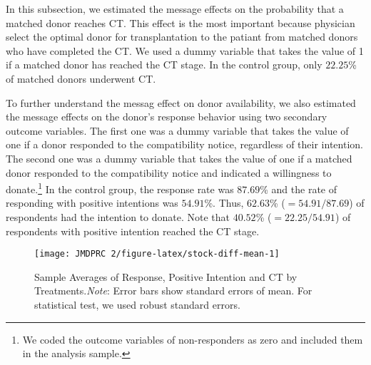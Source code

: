\documentclass[12pt, a4paper]{article}
\begin{document}
In this subsection, we estimated the message effects on the probability that a matched donor reaches CT. This effect is the most important because physician select the optimal donor for transplantation to the patiant from matched donors who have completed the CT. We used a dummy variable that takes the value of 1 if a matched donor has reached the CT stage. In the control group, only \(22.25\)\% of matched donors underwent CT.

To further understand the messag effect on donor availability, we also estimated the message effects on the donor's response behavior using two secondary outcome variables. The first one was a dummy variable that takes the value of one if a donor responded to the compatibility notice, regardless of their intention. The second one was a dummy variable that takes the value of one if a matched donor responded to the compatibility notice and indicated a willingness to donate.\footnote{We coded the outcome variables of non-responders as zero and included them in the analysis sample.} In the control group, the response rate was \(87.69\)\% and the rate of responding with positive intentions was \(54.91\)\%. Thus, \(62.63\)\% (\(=54.91/87.69\)) of respondents had the intention to donate. Note that \(40.52\)\% (\(=22.25/54.91\)) of respondents with positive intention reached the CT stage.

\begin{figure}[t]
\texttt{[image: JMDPRC~2/figure-latex/stock-diff-mean-1]} \caption{Sample Averages of Response, Positive Intention and CT by Treatments.\newline \emph{Note}: Error bars show standard errors of mean. For statistical test, we used robust standard errors.}\label{fig:stock-diff-mean}
\end{figure}
\end{document}
